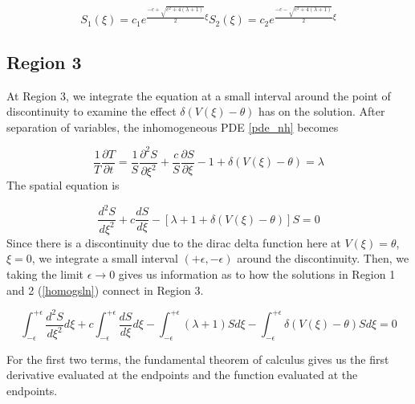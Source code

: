 \documentclass[12pt]{article}
\begin{document}
\begin{equation} \label{homogsln}
S_1(\xi) = c_1e^{\frac{-c+\sqrt{c^2+4(\lambda+1)}}{2}\xi}
S_2(\xi) = c_2e^{\frac{-c-\sqrt{c^2+4(\lambda+1)}}{2}\xi} 
\end{equation}

\subsection{Region 3}
At Region 3, we integrate the equation at a small interval around the point of discontinuity to examine the effect $\delta(V(\xi)-\theta)$ has on the solution. After separation of variables, the inhomogeneous PDE \ref{pde_nh} becomes

$$ \frac{1}{T}\frac{\partial T}{\partial t} = \frac{1}{S}\frac{\partial^2S}{\partial\xi^2} + \frac{c}{S}\frac{\partial S}{\partial\xi} - 1 + \delta(V(\xi)-\theta)= \lambda $$
The spatial equation is 

\begin{equation}\label{spatialdelta}
\frac{d^2S}{d\xi^2} + c\frac{dS}{d\xi} - [\lambda + 1 + \delta(V(\xi)-\theta)]S = 0
\end{equation} 
Since there is a discontinuity due to the dirac delta function here at $V(\xi) = \theta$, $\xi = 0$, we integrate a small interval $(+\epsilon,-\epsilon)$ around the discontinuity. Then, we taking the limit $\epsilon \to 0$ gives us information as to how the solutions in Region 1 and 2 (\ref{homogsln}) connect in Region 3.

$$ \int_{-\epsilon}^{+\epsilon}\frac{d^2S}{d\xi^2}d\xi + c\int_{-\epsilon}^{+\epsilon}\frac{dS}{d\xi}d\xi - \int_{-\epsilon}^{+\epsilon}(\lambda + 1)Sd\xi - \int_{-\epsilon}^{+\epsilon}\delta(V(\xi)-\theta)Sd\xi = 0 $$

For the first two terms, the fundamental theorem of calculus gives us the first derivative evaluated at the endpoints and the function evaluated at the endpoints.
\end{document}
